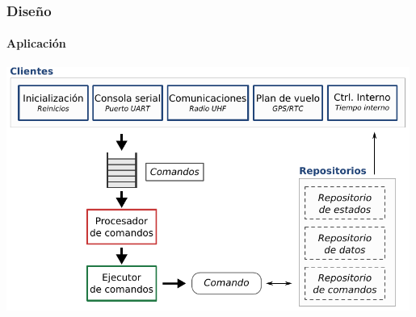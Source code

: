 \documentclass[xcolor=dvipsnames]{beamer}
\begin{document}
%         
%         
    
    \begin{frame}
        \frametitle{Diseño}
        \framesubtitle{Aplicación}
        
        \centering
        \includegraphics[width=0.99\textwidth]{img/arquitectura_suchai.pdf}
        
    \end{frame}
    
    \begin{frame}
        \centering \Large {}
        
    \end{frame}
    
\end{document}
